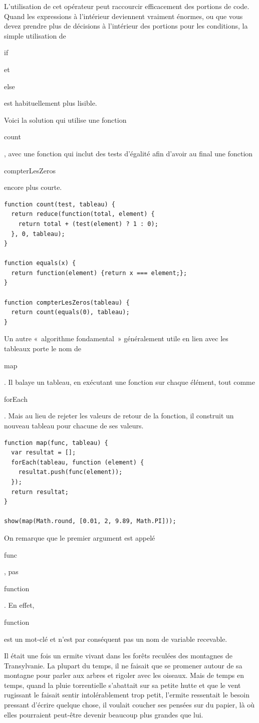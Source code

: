 \documentclass{FramateX}
\renewcommand{\texttt}[1]{\begin{sffamily}{#1}\end{sffamily}}
\begin{document}
L'utilisation de cet opérateur peut raccourcir efficacement des portions
de code. Quand les expressions à l'intérieur deviennent vraiment
énormes, ou que vous devez prendre plus de décisions à l'intérieur des
portions pour les conditions, la simple utilisation de \texttt{if} et
\texttt{else} est habituellement plus lisible.

Voici la solution qui utilise une fonction \texttt{count}, avec une
fonction qui inclut des tests d'égalité afin d'avoir au final une
fonction \texttt{compterLesZeros} encore plus courte.

\begin{lstlisting}
function count(test, tableau) {
  return reduce(function(total, element) {
    return total + (test(element) ? 1 : 0);
  }, 0, tableau);
}

function equals(x) {
  return function(element) {return x === element;};
}

function compterLesZeros(tableau) {
  return count(equals(0), tableau);
}
\end{lstlisting}
\begin{center}\end{center}

Un autre «~algorithme fondamental~» généralement utile en lien avec les
tableaux porte le nom de \texttt{map}. Il balaye un tableau, en
exécutant une fonction sur chaque élément, tout comme \texttt{forEach}.
Mais au lieu de rejeter les valeurs de retour de la fonction, il
construit un nouveau tableau pour chacune de ses valeurs.

\begin{lstlisting}
function map(func, tableau) {
  var resultat = [];
  forEach(tableau, function (element) {
    resultat.push(func(element));
  });
  return resultat;
}

show(map(Math.round, [0.01, 2, 9.89, Math.PI]));
\end{lstlisting}
On remarque que le premier argument est appelé \texttt{func}, pas
\texttt{function}. En effet, \texttt{function} est un mot-clé et n'est
par conséquent pas un nom de variable recevable.

\begin{center}\end{center}

Il était une fois un ermite vivant dans les forêts reculées des
montagnes de Transylvanie. La plupart du temps, il ne faisait que se
promener autour de sa montagne pour parler aux arbres et rigoler avec
les oiseaux. Mais de temps en temps, quand la pluie torrentielle
s'abattait sur sa petite hutte et que le vent rugissant le faisait
sentir intolérablement trop petit, l'ermite ressentait le besoin
pressant d'écrire quelque chose, il voulait coucher ses pensées sur du
papier, là où elles pourraient peut-être devenir beaucoup plus grandes
que lui.
\end{document}
